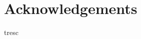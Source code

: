 \chapter*{Acknowledgements}

\thispagestyle{empty}

 \label{sec:acknowledgements}
	
	tresc

\thispagestyle{empty}
\mbox{}